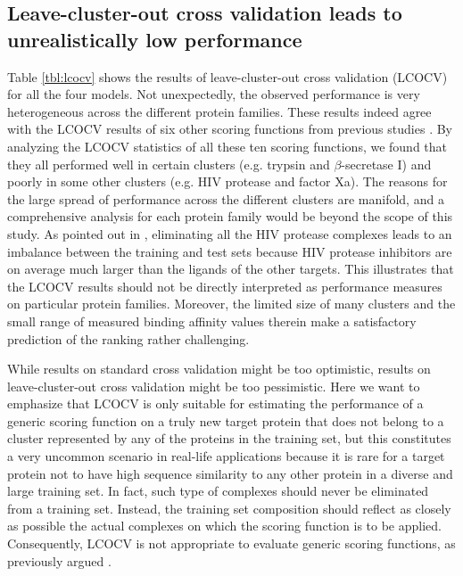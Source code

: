 \documentclass[linenumbers]{bmcart}
\begin{document}
\subsection*{Leave-cluster-out cross validation leads to unrealistically low performance}

Table \ref{tbl:lcocv} shows the results of leave-cluster-out cross validation (LCOCV) for all the four models. Not unexpectedly, the observed performance is very heterogeneous across the different protein families. These results indeed agree with the LCOCV results of six other scoring functions from previous studies \cite{774,1414,1194,1410,1347,1415}. By analyzing the LCOCV statistics of all these ten scoring functions, we found that they all performed well in certain clusters (e.g. trypsin and $\beta$-secretase I) and poorly in some other clusters (e.g. HIV protease and factor Xa). The reasons for the large spread of performance across the different clusters are manifold, and a comprehensive analysis for each protein family would be beyond the scope of this study. As pointed out in \cite{1347}, eliminating all the HIV protease complexes leads to an imbalance between the training and test sets because HIV protease inhibitors are on average much larger than the ligands of the other targets. This illustrates that the LCOCV results should not be directly interpreted as performance measures on particular protein families. Moreover, the limited size of many clusters and the small range of measured binding affinity values therein make a satisfactory prediction of the ranking rather challenging.

While results on standard cross validation might be too optimistic, results on leave-cluster-out cross validation might be too pessimistic. Here we want to emphasize that LCOCV is only suitable for estimating the performance of a generic scoring function on a truly new target protein that does not belong to a cluster represented by any of the proteins in the training set, but this constitutes a very uncommon scenario in real-life applications because it is rare for a target protein not to have high sequence similarity to any other protein in a diverse and large training set. In fact, such type of complexes should never be eliminated from a training set. Instead, the training set composition should reflect as closely as possible the actual complexes on which the scoring function is to be applied. Consequently, LCOCV is not appropriate to evaluate generic scoring functions, as previously argued \cite{908}.
\end{document}
